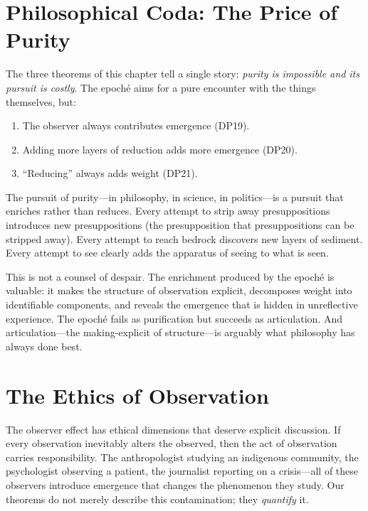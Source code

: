 \section{Philosophical Coda: The Price of Purity}

The three theorems of this chapter tell a single story: \emph{purity
is impossible and its pursuit is costly}. The epoch\'e aims for a pure
encounter with the things themselves, but:
\begin{enumerate}
\item The observer always contributes emergence (DP19).
\item Adding more layers of reduction adds more emergence (DP20).
\item ``Reducing'' always adds weight (DP21).
\end{enumerate}

The pursuit of purity---in philosophy, in science, in politics---is
a pursuit that enriches rather than reduces. Every attempt to strip
away presuppositions introduces new presuppositions (the presupposition
that presuppositions can be stripped away). Every attempt to reach
bedrock discovers new layers of sediment. Every attempt to see clearly
adds the apparatus of seeing to what is seen.

This is not a counsel of despair. The enrichment produced by the
epoch\'e is valuable: it makes the structure of observation explicit,
decomposes weight into identifiable components, and reveals the
emergence that is hidden in unreflective experience. The epoch\'e fails
as purification but succeeds as articulation. And articulation---the
making-explicit of structure---is arguably what philosophy has always
done best.

\section{The Ethics of Observation}

The observer effect has ethical dimensions that deserve explicit
discussion. If every observation inevitably alters the observed, then
the act of observation carries responsibility. The anthropologist
studying an indigenous community, the psychologist observing a patient,
the journalist reporting on a crisis---all of these observers introduce
emergence that changes the phenomenon they study. Our theorems do not
merely describe this contamination; they \emph{quantify} it.

